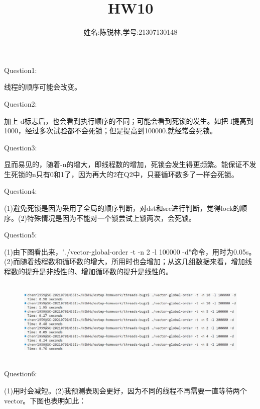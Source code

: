 \documentclass[12pt]{article}
\title{HW10}
\author{姓名:陈锐林,学号:21307130148}
\begin{document}
\maketitle
\begin{large}
    \noindent Question1:\par
\end{large}
线程的顺序可能会改变。\\
\begin{large}
    Question2:\par
\end{large}
加上-d标志后，也会看到执行顺序的不同；可能会看到死锁的发生。如把-l提高到1000，经过多次试验都不会死锁；但是提高到100000.就经常会死锁。\\
\begin{large}
    Question3:\par
\end{large}
显而易见的，随着-n的增大，即线程数的增加，死锁会发生得更频繁。能保证不发生死锁的n只有0和1了，因为再大的2在Q2中，只要循环数多了一样会死锁。\\
\begin{large}
    Question4:\par
\end{large}
(1)避免死锁是因为采用了全局的顺序判断，对dst和src进行判断，觉得lock的顺序。(2)特殊情况是因为不能对一个锁尝试上锁两次，会死锁。\\
\begin{large}
    Question5:\par
\end{large}
(1)由下图看出来，"./vector-global-order -t -n 2 -l 100000 -d"命令，用时为0.05s。(2)而随着线程数和循环数的增大，所用时也会增加；从这几组数据来看，增加线程数的提升是非线性的、增加循环数的提升是线性的。
\begin{figure}[H]
    \centering
    \includegraphics[height=4cm]{hw10-1.jpg}
\end{figure}
\newpage
\begin{large}
    \noindent Question6:\par
\end{large}
(1)用时会减短。(2)我预测表现会更好，因为不同的线程不再需要一直等待两个vector。下图也表明如此：
\end{document}
